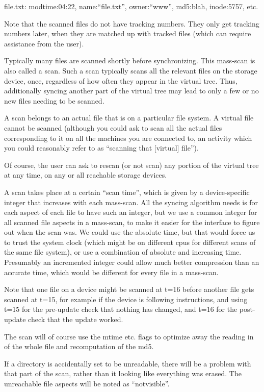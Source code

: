 \documentclass{book}
\begin{document}
	file.txt: modtime:04:22, name:``file.txt'', owner:``www'', md5:blah, inode:5757, etc.

Note that the scanned files do not have tracking numbers.  They only get tracking numbers later, when they are matched up with tracked files (which can require assistance from the user).

Typically many files are scanned shortly before synchronizing.  This mass-scan is also called a scan.  Such a scan typically scans all the relevant files on the storage device, once, regardless of how often they appear in the virtual tree.  Thus, additionally syncing another part of the virtual tree may lead to only a few or no new files needing to be scanned.

A scan belongs to an actual file that is on a particular file system.  A virtual file cannot be scanned (although you could ask to scan all the actual files corresponding to it on all the machines you are connected to, an activity which you could reasonably refer to as ``scanning that [virtual] file'').

Of course, the user can ask to rescan (or not scan) any portion of the virtual tree at any time, on any or all reachable storage devices.

A scan takes place at a certain ``scan time'', which is given by a device-specific integer that increases with each mass-scan.  All the syncing algorithm needs is for each aspect of each file to have such an integer, but we use a common integer for all scanned file aspects in a mass-scan, to make it easier for the interface to figure out when the scan was.  We could use the absolute time, but that would force us to trust the system clock (which might be on different cpus for different scans of the same file system), or use a combination of absolute and increasing time.  Presumably an incremented integer could allow much better compression than an accurate time, which would be different for every file in a mass-scan.

Note that one file on a device might be scanned at t=16 before another file gets scanned at t=15, for example if the device is following instructions, and using t=15 for the pre-update check that nothing has changed, and t=16 for the post-update check that the update worked.

The scan will of course use the mtime etc. flags to optimize away the reading in of the whole file and recomputation of the md5.

If a directory is accidentally set to be unreadable, there will be a problem with that part of the scan, rather than it looking like everything was erased.  The unreachable file aspects will be noted as ``notvisible''.
\end{document}
